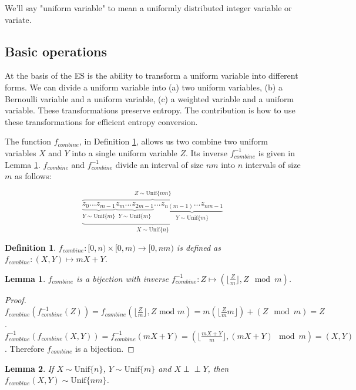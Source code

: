 \documentclass[12pt]{article}
\newtheorem{lemma}{Lemma}
\newtheorem{definition}{Definition}
\newcommand{\indep}{\perp\!\!\!\perp}
\newcommand{\unif}[1]{\mathrm{Unif}\{#1\}}
\begin{document}
We'll say "uniform variable" to mean a uniformly distributed integer variable or variate.


\subsection{Basic operations}

At the basis of the ES is the ability to transform a uniform variable into different forms.  We can divide a uniform variable into (a) two uniform variables, (b) a Bernoulli variable and a uniform variable, (c) a weighted variable and a uniform variable. These transformations preserve entropy. The contribution is how to use these transformations for efficient entropy conversion.

The function $f_{combine}$, in Definition \ref{def:combine}, allows us two combine two uniform variables $X$ and $Y$ into a single uniform variable $Z$. Its inverse $f^{-1}_{combine}$ is given in Lemma \ref{lem:divide}. $f_{combine}$ and $f^{-1}_{combine}$ divide an interval of size $nm$ into $n$ intervals of size $m$ as follows:

\[
\overbrace{    
    \underbrace{
        \underbrace{z_0 ... z_{m-1}}_{Y \sim \unif{m}}
        \underbrace{z_m ... z_{2m-1}}_{Y \sim \unif{m}}
        ...
        \underbrace{z_{n(m-1)}...z_{nm-1}}_{Y \sim \unif{m}}    
    }}_{X \sim \unif{n}}
^{Z \sim \unif{nm}}
\]

\begin{definition}
    $f_{combine}: [0,n)\times [0,m) \rightarrow [0,nm)$ is defined as $f_{combine}: (X,Y) \mapsto mX+Y$.
    \label{def:combine}
\end{definition}

\begin{lemma}
    $f_{combine}$ is a bijection with inverse $f^{-1}_{combine}: Z \mapsto (\lfloor \frac{Z}{m} \rfloor, Z \mod m)$.
    \label{lem:divide}
\end{lemma}

\begin{proof}
    $f_{combine}(f^{-1}_{combine}(Z)) = f_{combine}(\lfloor \frac{Z}{m}\rfloor, Z \text{ mod } m) = m(\lfloor \frac{Z}{m}m \rfloor) + (Z \mod m) = Z$. $f^{-1}_{combine}(f_{combine}(X,Y)) = f^{-1}_{combine}(mX+Y) = (\lfloor\frac{mX+Y}{m}\rfloor, (mX+Y)\mod m) = (X,Y)$. Therefore $f_{combine}$ is a bijection.
\end{proof}

\begin{lemma}
    If $X \sim \unif{n}$, $Y \sim \unif{m}$ and $X \indep Y$, then 
    $f_{combine}(X,Y) \sim \unif{nm}$.
    \label{lem:combine}
\end{lemma}
\end{document}
